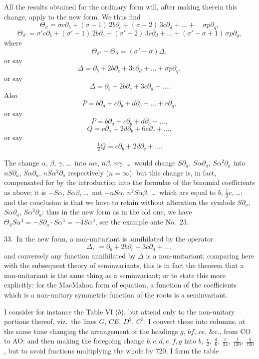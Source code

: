 \documentclass[11pt]{article}
\begin{document}
All the results obtained for the ordinary form will, after making therein this change, apply to the new form. We thus find
\[
\Theta_\sigma = \sigma c\partial_b + (\sigma - 1)\, 2b\partial_c + (\sigma - 2)\, 3c\partial_d + \ldots + \quad \sigma p\partial_q,
\]
\[
\Theta_{\sigma'} = \sigma' c\partial_b + (\sigma' - 1)\, 2b\partial_c + (\sigma' - 2)\, 3c\partial_d + \ldots + (\sigma' - \sigma + 1)\, \sigma p\partial_q,
\]
where
\[
\Theta_{\sigma'} - \Theta_\sigma = (\sigma' - \sigma)\Delta,
\]
or say
\[
\Delta = \partial_b + 2b\partial_c + 3c\partial_d + \ldots + \sigma p\partial_q,
\]
or say
\[
\Delta = \partial_b + 2b\partial_c + 3c\partial_d + \ldots.
\]
Also
\[
P = b\partial_a + c\partial_b + d\partial_c + \ldots + r\partial_q,
\]
or say
\[
P = b\partial_a + c\partial_b + d\partial_c + \ldots,
\]
\[
Q = c\partial_a + 2d\partial_b + 6e\partial_c + \ldots,
\]
or say
\[
\tfrac{1}{2}Q = c\partial_b + 2d\partial_c + \ldots.
\]

The change $\alpha$, $\beta$, $\gamma$, \ldots\ into $n\alpha$, $n\beta$, $n\gamma$, \ldots\ would change $S\partial_a$, $S\alpha\partial_a$, $S\alpha^2\partial_a$ into $n S\partial_a$, $S\alpha\partial_a$, $n S\alpha^2\partial_a$ respectively ($n = \infty$): but this change is, in fact, compensated for by the introduction into the formulae of the binomial coefficients as above; it is $-S\alpha$, $S\alpha\beta$, \ldots\ not $-nS\alpha$, $n^2 S\alpha\beta$, \ldots\ which are equal to $b$, $\tfrac{1}{2}c$, \ldots; and the conclusion is that we have to retain without alteration the symbols $S\partial_a$, $S\alpha\partial_a$, $S\alpha^2\partial_a$: thus in the new form as in the old one, we have $\Theta_4 S\alpha^4 = -S\partial_a\cdot S\alpha^4 = -4S\alpha^3$, see the example ante No.\ 23.

33.\ In the new form, a non-unitariant is annihilated by the operator
\[
\Delta,\ = \partial_b + 2b\partial_c + 3c\partial_d + \ldots,
\]
and conversely any function annihilated by $\Delta$ is a non-unitariant; comparing here with the subsequent theory of seminvariants, this is in fact the theorem that a non-unitariant is the same thing as a seminvariant; or to state this more explicitly: for the MacMahon form of equation, a function of the coefficients which is a non-unitary symmetric function of the roots is a seminvariant.

I consider for instance the Table VI ($b$), but attend only to the non-unitary portions thereof, viz.\ the lines $G$, $CE$, $D^2$, $C^3$: I convert these into columns, at the same time changing the arrangement of the headings $g$, $bf$, $ce$, \&c., from CO to AO: and then making the foregoing change $b, c, d, e, f, g$ into $b,\ \tfrac{c}{2},\ \tfrac{d}{6},\ \tfrac{e}{24},\ \tfrac{f}{120},\ \tfrac{g}{720}$, but to avoid fractions multiplying the whole by 720, I form the table
\end{document}
